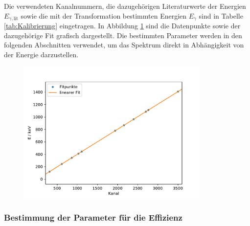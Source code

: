 Die verwendeten Kanalnummern, die dazugehörigen Literaturwerte der Energien
$E_{\gamma, \text{lit}}$ sowie die mit der Transformation bestimmten Energien
$E_{\gamma}$ sind in Tabelle \ref{tab:Kalibrierung} eingetragen. In Abbildung
\ref{fig:Kalibrierung} sind die Datenpunkte sowie der dazugehörige Fit
grafisch dargestellt. Die bestimmten Parameter werden in den folgenden Abschnitten
verwendet, um das Spektrum direkt in Abhängigkeit von der Energie darzustellen.
\begin{figure}
  \centering
  \includegraphics[width = 0.85\textwidth]{Python/Plots/Kalibrierung.pdf}
  \caption{}
  \label{fig:Kalibrierung}
\end{figure}


\subsubsection{Bestimmung der Parameter für die Effizienz}
\label{subsubsec:Eff}

